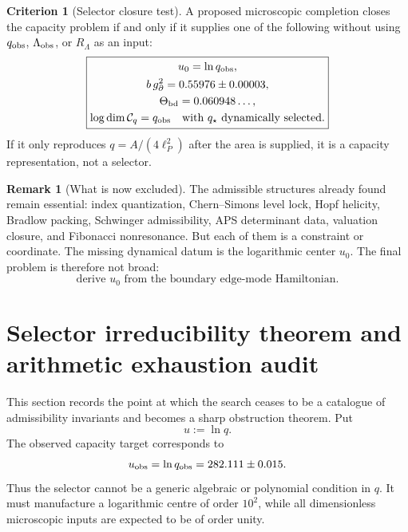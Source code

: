 \documentclass[aps,prd,reprint,nofootinbib,superscriptaddress,floatfix]{revtex4-2}
\numberwithin{equation}{section}
\theoremstyle{definition}
\newtheorem{criterion}{Criterion}[section]
\newtheorem{remark}{Remark}[section]
\theoremstyle{plain}
\begin{document}
\begin{criterion}[Selector closure test]
A proposed microscopic completion closes the capacity problem if and
only if it supplies one of the following without using \(q_{\rm obs}\),
\(\Lambda_{\rm obs}\), or \(R_\Lambda\) as an input:
\[
\boxed{
\begin{gathered}
u_0=\ln q_{\rm obs},\\
b\,g_\partial^2=0.55976\pm0.00003,\\
\Theta_{\rm bd}=0.060948\ldots,\\
\log\dim\mathcal C_q=q_{\rm obs}
\quad\text{with }q_\star\text{ dynamically selected.}
\end{gathered}}
\]
If it only reproduces \(q=A/(4\ell_P^2)\) after the area is supplied,
it is a capacity representation, not a selector.
\end{criterion}

\begin{remark}[What is now excluded]
The admissible structures already found remain essential:
index quantization, Chern--Simons level lock, Hopf helicity, Bradlow
packing, Schwinger admissibility, APS determinant data, valuation
closure, and Fibonacci nonresonance.  But each of them is a constraint
or coordinate.  The missing dynamical datum is the logarithmic center
\(u_0\).  The final problem is therefore not broad:
\[
\boxed{
\text{derive }u_0\text{ from the boundary edge-mode Hamiltonian.}
}
\]
\end{remark}


\section{Selector irreducibility theorem and arithmetic exhaustion audit}
\label{sec:selector-irreducibility}

This section records the point at which the search ceases to be a catalogue of
admissibility invariants and becomes a sharp obstruction theorem.  Put
\begin{equation}
u:=\ln q .
\end{equation}
The observed capacity target corresponds to
\begin{equation}
u_{\rm obs}=\ln q_{\rm obs}=282.111\pm0.015 .
\end{equation}
Thus the selector cannot be a generic algebraic or polynomial condition in
\(q\).  It must manufacture a logarithmic centre of order \(10^2\), while all
dimensionless microscopic inputs are expected to be of order unity.
\end{document}
